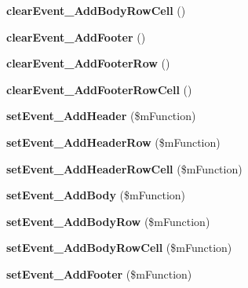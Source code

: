 \begin{DoxyCompactItemize}
\item 
\hypertarget{classclsTable_a09b3107b79ac03188fbca4d1adb62eba}{
{\bfseries clearEvent\_\-AddBodyRowCell} ()}
\label{classclsTable_a09b3107b79ac03188fbca4d1adb62eba}

\item 
\hypertarget{classclsTable_a5cc34e79890e0aabcb69e97a979fc85e}{
{\bfseries clearEvent\_\-AddFooter} ()}
\label{classclsTable_a5cc34e79890e0aabcb69e97a979fc85e}

\item 
\hypertarget{classclsTable_a455c3d05f1886513b2f844bd8efb5768}{
{\bfseries clearEvent\_\-AddFooterRow} ()}
\label{classclsTable_a455c3d05f1886513b2f844bd8efb5768}

\item 
\hypertarget{classclsTable_af04eed3773535b71eb5b97eeb6156a56}{
{\bfseries clearEvent\_\-AddFooterRowCell} ()}
\label{classclsTable_af04eed3773535b71eb5b97eeb6156a56}

\item 
\hypertarget{classclsTable_a2811ff584f32c227afa2f2f1a9e52deb}{
{\bfseries setEvent\_\-AddHeader} (\$mFunction)}
\label{classclsTable_a2811ff584f32c227afa2f2f1a9e52deb}

\item 
\hypertarget{classclsTable_ab6357068136baed1a2007c5984076e64}{
{\bfseries setEvent\_\-AddHeaderRow} (\$mFunction)}
\label{classclsTable_ab6357068136baed1a2007c5984076e64}

\item 
\hypertarget{classclsTable_a504b7aa42e7c4aa0dbd9f07f1878740e}{
{\bfseries setEvent\_\-AddHeaderRowCell} (\$mFunction)}
\label{classclsTable_a504b7aa42e7c4aa0dbd9f07f1878740e}

\item 
\hypertarget{classclsTable_a2fd5eb3f15840bf93e5fc30736b5e7d6}{
{\bfseries setEvent\_\-AddBody} (\$mFunction)}
\label{classclsTable_a2fd5eb3f15840bf93e5fc30736b5e7d6}

\item 
\hypertarget{classclsTable_aa9fb7a26c5faf62af4d403b2997044fe}{
{\bfseries setEvent\_\-AddBodyRow} (\$mFunction)}
\label{classclsTable_aa9fb7a26c5faf62af4d403b2997044fe}

\item 
\hypertarget{classclsTable_a205ab5420664083324d139784ef85cfa}{
{\bfseries setEvent\_\-AddBodyRowCell} (\$mFunction)}
\label{classclsTable_a205ab5420664083324d139784ef85cfa}

\item 
\hypertarget{classclsTable_a1392fed0ae5800b3bb72f36ec0f83b8e}{
{\bfseries setEvent\_\-AddFooter} (\$mFunction)}
\label{classclsTable_a1392fed0ae5800b3bb72f36ec0f83b8e}


\end{DoxyCompactItemize}
